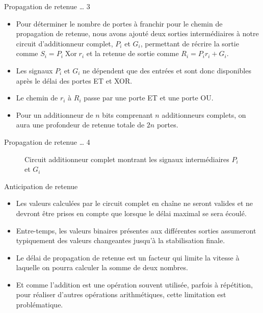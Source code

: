 \documentclass[presentation]{beamer}
\begin{document}
\begin{frame}[label={sec:org2ac43bf}]{Propagation de retenue \ldots{} 3}
\begin{itemize}
\item Pour déterminer le nombre de portes à franchir pour le chemin de propagation de retenue, nous avons ajouté deux sorties intermédiaires à notre circuit d'additionneur complet, \(P_i\) et \(G_i\), permettant de récrire la sortie comme \(S_i = P_i \operatorname{Xor} r_i\) et la retenue de sortie comme \(R_i = P_i r_i + G_i\).

\item Les signaux \(P_i\) et \(G_i\) ne dépendent que des entrées et sont donc disponibles après le délai des portes ET et XOR.

\item Le chemin de \(r_i\) à \(R_i\) passe par une porte ET et une porte OU.

\item Pour un additionneur de \(n\) bits comprenant \(n\) additionneurs complets, on aura une profondeur de retenue totale de \(2n\) portes.
\end{itemize}
\end{frame}

\begin{frame}[label={sec:orgb405e76}]{Propagation de retenue \ldots{} 4}
\begin{figure}[htbp]
\centering

\caption{\label{fig:org5043dc5}Circuit additionneur complet montrant les signaux intermédiaires \(P_i\) et \(G_i\)}
\end{figure}
\end{frame}

\begin{frame}[label={sec:org15c7d09}]{Anticipation de retenue}
\begin{itemize}
\item Les valeurs calculées par le circuit complet en chaîne ne seront valides et ne devront être prises en compte que lorsque le délai maximal se sera écoulé.

\item Entre-temps, les valeurs binaires présentes aux différentes sorties assumeront typiquement des valeurs changeantes jusqu'à la stabilisation finale.

\item Le délai de propagation de retenue est un facteur qui limite la vitesse à laquelle on pourra calculer la somme de deux nombres.

\item Et comme l'addition est une opération souvent utilisée, parfois à répétition, pour réaliser d'autres opérations arithmétiques, cette limitation est problématique.
\end{itemize}
\end{frame}
\end{document}
